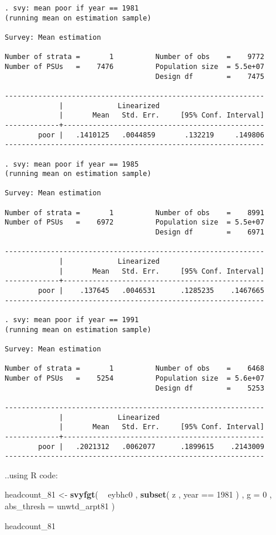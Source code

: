 \documentclass[]{book}
\newenvironment{Shaded}{\begin{snugshade}}{\end{snugshade}}
\newcommand{\KeywordTok}[1]{\textcolor[rgb]{0.13,0.29,0.53}{\textbf{{#1}}}}
\newcommand{\DataTypeTok}[1]{\textcolor[rgb]{0.13,0.29,0.53}{{#1}}}
\newcommand{\DecValTok}[1]{\textcolor[rgb]{0.00,0.00,0.81}{{#1}}}
\newcommand{\StringTok}[1]{\textcolor[rgb]{0.31,0.60,0.02}{{#1}}}
\newcommand{\NormalTok}[1]{{#1}}
\begin{document}
\begin{verbatim}
. svy: mean poor if year == 1981
(running mean on estimation sample)

Survey: Mean estimation

Number of strata =       1          Number of obs    =    9772
Number of PSUs   =    7476          Population size  = 5.5e+07
                                    Design df        =    7475

--------------------------------------------------------------
             |             Linearized
             |       Mean   Std. Err.     [95% Conf. Interval]
-------------+------------------------------------------------
        poor |   .1410125   .0044859       .132219     .149806
--------------------------------------------------------------

. svy: mean poor if year == 1985
(running mean on estimation sample)

Survey: Mean estimation

Number of strata =       1          Number of obs    =    8991
Number of PSUs   =    6972          Population size  = 5.5e+07
                                    Design df        =    6971

--------------------------------------------------------------
             |             Linearized
             |       Mean   Std. Err.     [95% Conf. Interval]
-------------+------------------------------------------------
        poor |    .137645   .0046531      .1285235    .1467665
--------------------------------------------------------------

. svy: mean poor if year == 1991
(running mean on estimation sample)

Survey: Mean estimation

Number of strata =       1          Number of obs    =    6468
Number of PSUs   =    5254          Population size  = 5.6e+07
                                    Design df        =    5253

--------------------------------------------------------------
             |             Linearized
             |       Mean   Std. Err.     [95% Conf. Interval]
-------------+------------------------------------------------
        poor |   .2021312   .0062077      .1899615    .2143009
--------------------------------------------------------------
\end{verbatim}

..using R code:

\begin{Shaded}
\begin{Highlighting}[]
\NormalTok{headcount_81 <-}\StringTok{ }
\StringTok{    }\KeywordTok{svyfgt}\NormalTok{( }
        \NormalTok{~}\StringTok{ }\NormalTok{eybhc0 , }
        \KeywordTok{subset}\NormalTok{( z , year ==}\StringTok{ }\DecValTok{1981} \NormalTok{) , }
        \DataTypeTok{g =} \DecValTok{0} \NormalTok{, }
        \DataTypeTok{abs_thresh =} \NormalTok{unwtd_arpt81}
    \NormalTok{)}

\NormalTok{headcount_81}
\end{Highlighting}
\end{Shaded}
\end{document}

